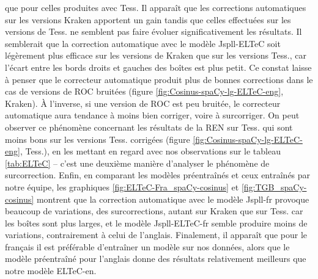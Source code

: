 que pour celles produites avec Tess. Il apparaît 
que les corrections automatiques sur les versions Kraken apportent un gain tandis que celles effectuées sur les versions de Tess. ne semblent pas faire évoluer significativement les résultats.
Il semblerait que la correction automatique avec le modèle Jspll-ELTeC soit légèrement plus efficace sur les versions de Kraken que sur les versions Tess., car l'écart entre les bords droits et gauches des boîtes est plus petit. Ce constat laisse à penser que le correcteur automatique produit plus de bonnes corrections dans le cas de versions de ROC bruitées
(figure \ref{fig:Cosinus-spaCy-lg-ELTeC-eng}, Kraken). À l'inverse, si une version de ROC est peu bruitée, le correcteur automatique aura tendance à moins bien corriger, voire à surcorriger. 
On peut observer ce phénomène concernant les résultats de la REN sur Tess. qui sont moins bons sur les versions Tess. corrigées (figure \ref{fig:Cosinus-spaCy-lg-ELTeC-eng}, Tess.), 
en les mettant en regard avec nos observations sur le tableau \ref{tab:ELTeC} -- c'est une deuxième manière d'analyser le phénomène de surcorrection. 
Enfin, en comparant les modèles préentraînés et ceux entraînés par notre équipe,
les graphiques \ref{fig:ELTeC-Fra_spaCy-cosinus} et \ref{fig:TGB_spaCy-cosinus} montrent que la correction automatique avec le modèle Jspll-fr provoque beaucoup de variations, des surcorrections, autant sur Kraken que sur Tess. car les boîtes sont plus larges, et le modèle Jspll-ELTeC-fr semble produire moins de variations, contrairement à celui de l'anglais. 
Finalement, il apparaît que pour le français il est préférable d'entraîner un modèle sur nos données, alors que le modèle préentraîné pour l'anglais donne des résultats relativement meilleurs que notre modèle ELTeC-en.  



